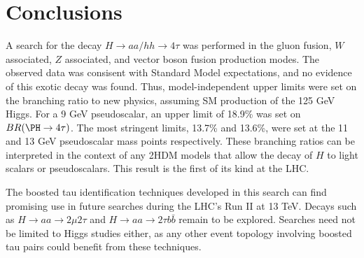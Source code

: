 \chapter{Conclusions\label{sec:conclusions}}

A search for the decay $H\rightarrow$$aa/hh\rightarrow4\tau$ was performed in the gluon fusion, $W$ associated, $Z$ associated, and vector boson fusion production modes. The observed data was consisent with Standard Model expectations, and no evidence of this exotic decay was found. Thus, model-independent upper limits were set on the branching ratio to new physics, assuming SM production of the 125 GeV Higgs.  For a 9 GeV pseudoscalar, an upper limit of 18.9\% was set on $BR(\PH\to4\tau)$. The most stringent limits, 13.7\% and 13.6\%, were set at the 11 and 13 GeV pseudoscalar mass points respectively. These branching ratios can be interpreted in the context of any 2HDM models that allow the decay of $H$ to light scalars or pseudoscalars. This result is the first of its kind at the LHC.

The boosted tau identification techniques developed in this search can find promising use in future searches during the LHC's Run II at 13 TeV. Decays such as $H\rightarrow$$aa\rightarrow2\mu2\tau$ and $H\rightarrow$$aa\rightarrow2\tau b\bar{b}$ remain to be explored. Searches need not be limited to Higgs studies either, as any other event topology involving boosted tau pairs could benefit from these techniques.